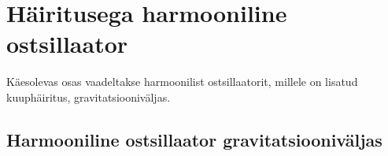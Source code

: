 \documentclass{trkut}%
\begin{document}
%

\section{Häiritusega harmooniline ostsillaator}

Käesolevas osas vaadeltakse harmoonilist ostsillaatorit, millele on lisatud kuuphäiritus, gravitatsiooniväljas.

\subsection{Harmooniline ostsillaator gravitatsiooniväljas}
\end{document}
